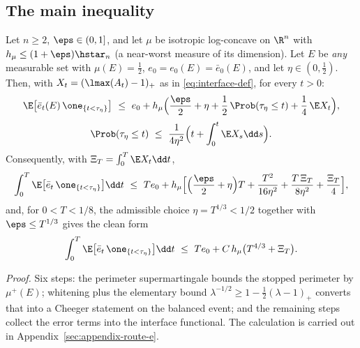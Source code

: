 \documentclass[../../main.tex]{subfiles}
\begin{document}
\subsection{The main inequality}

\begin{theorem}
\label{thm:bootstrap}
Let $n\ge2$, $\eps\in(0,1]$, and let $\mu$ be isotropic log-concave on $\R^n$ with
$h_\mu\le(1+\eps)\hstar_n$ (a near-worst measure of its dimension). Let $E$ be \emph{any}
measurable set with $\mu(E)=\tfrac12$, $e_0=e_0(E)=\bar e_0(E)$, and let $\eta\in(0,\tfrac12)$.
Then, with $X_t=(\lmax(A_t)-1)_+$ as in \eqref{eq:interface-def}, for every $t>0$:
\begin{equation}\label{eq:bootstrap-main}
  \E\bigl[\bar e_t(E)\,\one_{\{t<\tau_\eta\}}\bigr]
  \ \le\
  e_0+h_\mu\Bigl(\frac\eps2+\eta+\frac12\,\Prob(\tau_\eta\le t)+\frac14\,\E X_t\Bigr),
\end{equation}
\begin{equation}\label{eq:bootstrap-exit}
  \Prob(\tau_\eta\le t)\ \le\ \frac1{4\eta^2}\Bigl(t+\int_0^t\E X_s\dd s\Bigr).
\end{equation}
Consequently, with $\Xi_T=\int_0^T\E X_t\dd t$,
\begin{equation}\label{eq:bootstrap-integrated}
  \int_0^T\E\bigl[\bar e_t\,\one_{\{t<\tau_\eta\}}\bigr]\dd t
  \ \le\
  T e_0+h_\mu\Bigl[\Bigl(\frac\eps2+\eta\Bigr)T
  +\frac{T^2}{16\eta^2}+\frac{T\,\Xi_T}{8\eta^2}+\frac{\Xi_T}{4}\Bigr],
\end{equation}
and, for $0<T<1/8$, the admissible choice $\eta=T^{1/3}<1/2$ together with
$\eps\le T^{1/3}$ gives the clean form
\begin{equation}\label{eq:clean-form}
  \int_0^T\E\bigl[\bar e_t\,\one_{\{t<\tau_\eta\}}\bigr]\dd t
  \ \le\ Te_0+C\,h_\mu\bigl(T^{4/3}+\Xi_T\bigr).
\end{equation}
\end{theorem}

\noindent\emph{Proof.} Six steps: the perimeter supermartingale bounds the stopped perimeter by $\mu^+(E)$; whitening plus the elementary bound $\lambda^{-1/2}\ge1-\tfrac12(\lambda-1)_+$ converts that into a Cheeger statement on the balanced event; and the remaining steps collect the error terms into the interface functional. The calculation is carried out in Appendix~\ref{sec:appendix-route-e}.
\end{document}
